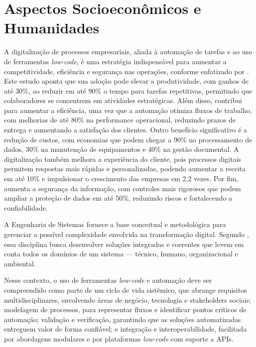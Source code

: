 
\chapter{Aspectos Socioeconômicos e Humanidades}\label{chap:humanidades} %

A digitalização de processos empresariais, aliada à automação de tarefas e ao uso de ferramentas \textit{low-code}, é uma 
estratégia indispensável para aumentar a competitividade, eficiência e segurança nas operações, conforme enfatizado por 
\cite{sebraeDigitalizacaoProcessos}. Este estudo aponta que sua adoção pode elevar a produtividade, com ganhos de até 30\%, 
ao reduzir em até 90\% o tempo para tarefas repetitivas, permitindo que colaboradores se concentrem em atividades estratégicas. 
Além disso, contribui para aumentar a eficiência, uma vez que a automação otimiza fluxos de trabalho, com melhorias de até 80\% 
na performance operacional, reduzindo prazos de entrega e aumentando a satisfação dos clientes. Outro benefício significativo 
é a redução de custos, com economias que podem chegar a 90\% no processamento de dados, 30\% na manutenção de equipamentos e 
40\% na gestão documental. A digitalização também melhora a experiência do cliente, pois processos digitais permitem respostas 
mais rápidas e personalizadas, podendo aumentar a receita em até 10\% e impulsionar o crescimento das empresas em 2,2 vezes. 
Por fim, aumenta a segurança da informação, com controles mais rigorosos que podem ampliar a proteção de dados em até 50\%, 
reduzindo riscos e fortalecendo a confiabilidade.

A Engenharia de Sistemas fornece a base conceitual e metodológica para gerenciar a possível complexidade envolvida na 
transformação digital. Segundo \cite{incoseHandbook}, essa disciplina busca desenvolver soluções integradas e coerentes 
que levem em conta todos os domínios de um sistema — técnico, humano, organizacional e ambiental.

Nesse contexto, o uso de ferramentas \textit{low-code} e automação deve ser compreendido como parte de um ciclo de vida 
sistêmico, que abrange requisitos multidisciplinares, envolvendo áreas de negócio, tecnologia e stakeholders sociais; 
modelagem de processos, para representar fluxos e identificar pontos críticos de automação; validação e verificação, 
garantindo que as soluções automatizadas entreguem valor de forma confiável; e integração e interoperabilidade, 
facilitada por abordagens modulares e por plataformas \textit{low-code} com suporte a APIs.

